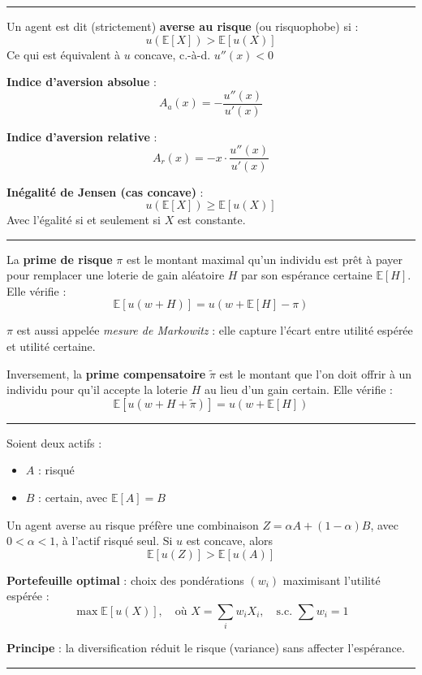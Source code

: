 \hrule

\begin{f}
	Un agent est dit (strictement) \textbf{averse au risque} (ou risquophobe) si :
	\[
	u(\mathbb{E}[X]) > \mathbb{E}[u(X)]
	\]
	Ce qui est équivalent à \(u\) concave, c.-à-d. \(u''(x) < 0\)
\end{f}

\begin{f}
	\textbf{Indice d'aversion absolue} :
	\[
	A_a(x) = -\frac{u''(x)}{u'(x)}
	\]
	
	\textbf{Indice d'aversion relative} :
	\[
	A_r(x) = -x \cdot \frac{u''(x)}{u'(x)}
	\]
	
	\textbf{Inégalité de Jensen (cas concave)} :
	\[
	u(\mathbb{E}[X]) \geq \mathbb{E}[u(X)]
	\]
Avec l'égalité si et seulement si \(X\) est constante.
\end{f}
\hrule


\begin{f}
	
La \textbf{prime de risque} \(\pi\) est le montant maximal qu'un individu est prêt à payer pour remplacer une loterie de gain aléatoire \(H\) par son espérance certaine \(\mathbb{E}[H]\). Elle vérifie :
\[
\mathbb{E}[u(w + H)] = u(w + \mathbb{E}[H] - \pi)
\]


\(\pi\) est aussi appelée \emph{mesure de Markowitz} : elle capture l'écart entre utilité espérée et utilité certaine.

Inversement, la \textbf{prime compensatoire} \(\tilde{\pi}\) est le montant que l'on doit offrir à un individu pour qu’il accepte la loterie \(H\) au lieu d’un gain certain. Elle vérifie :
\[
\mathbb{E}[u(w + H + \tilde{\pi})] = u(w + \mathbb{E}[H])
\]

\end{f}
\hrule
\begin{f}
	
	Soient deux actifs :
	\begin{itemize}
		\item \(A\) : risqué
		\item \(B\) : certain, avec \(\mathbb{E}[A] = B\)
	\end{itemize}
	
	Un agent averse au risque préfère une combinaison \(Z = \alpha A + (1 - \alpha) B\), avec \(0 < \alpha < 1\), à l’actif risqué seul.
	Si  \(u\) est concave, alors
	\[
	\mathbb{E}[u(Z)] > \mathbb{E}[u(A)]
	\]
	
	\textbf{Portefeuille optimal} : choix des pondérations \((w_i)\) maximisant l'utilité espérée :
	\[
	\max \mathbb{E}[u(X)], \quad \text{où } X = \sum_{i} w_i X_i, \quad \text{s.c. } \sum w_i = 1
	\]
	
	\textbf{Principe} : la diversification réduit le risque (variance) sans affecter l’espérance.
	
	
\end{f}
\hrule

